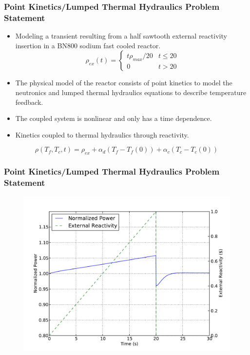 \documentclass{beamer}
\begin{document}
\begin{frame}
\frametitle{Point Kinetics/Lumped Thermal Hydraulics Problem Statement}

\begin{itemize}
  \item Modeling a transient resulting from a half sawtooth external reactivity insertion in a BN800 sodium fast cooled reactor.
\begin{equation}
 \rho_{ex}(t) = \left\{
  \begin{array}{cr}
   t\rho_{max}/20 & t \leq 20 \\
    0                      & t > 20 
    \end{array}
    \right. \nonumber
\end{equation}     
  \item The physical model of the reactor consists of point kinetics to model the neutronics and lumped thermal hydraulics equations to describe temperature feedback. 
  \item The coupled system is nonlinear and only has a time dependence.
  \item Kinetics coupled to thermal hydraulics through reactivity. 
\end{itemize}

\begin{equation}
 \rho(T_f,T_c,t) = \rho_{ex} + \alpha_d(T_f - T_f(0))
    + \alpha_c(T_c - T_c(0)) \nonumber
\end{equation}

\end{frame}
\begin{frame}
\frametitle{Point Kinetics/Lumped Thermal Hydraulics Problem Statement}

\begin{figure}
 \begin{center}
  \includegraphics[width=.9\textwidth]{./pk_power.pdf}
 \end{center}
\end{figure}

\end{frame}
\end{document}
